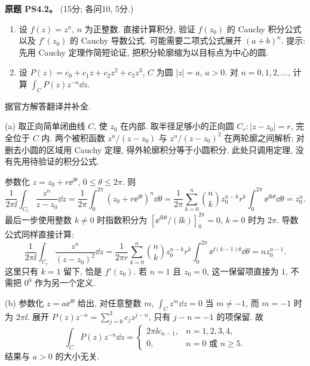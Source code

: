 \begin{exercise}\label{ass:ps4-2}
\textbf{原题 PS4.2。} (15分; 各问10, 5分.)
\begin{enumerate}[label=(\alph*)]
\item 设 $f(z)=z^n$, $n$ 为正整数. 直接计算积分, 验证 $f(z_0)$ 的 Cauchy 积分公式以及 $f'(z_0)$ 的 Cauchy 导数公式.
可能需要二项式公式展开 $(a+b)^n$. 提示: 先用 Cauchy 定理作简短论证, 把积分轮廓缩为以目标点为中心的圆.
\item 设 $P(z)=c_0+c_1z+c_2z^2+c_3z^3$, $C$ 为圆 $|z|=a$, $a>0$. 对 $n=0,1,2,\ldots$, 计算 $\int_CP(z)z^{-n}\dd z$.
\end{enumerate}
\end{exercise}
\begin{solution}
据官方解答翻译并补全.

(a) 取正向简单闭曲线 $C$, 使 $z_0$ 在内部. 取半径足够小的正向圆
$C_r:|z-z_0|=r$, 完全位于 $C$ 内. 两个被积函数 $z^n/(z-z_0)$ 与 $z^n/(z-z_0)^2$ 在两轮廓之间解析; 对删去小圆的区域用 Cauchy 定理, 得外轮廓积分等于小圆积分. 此处只调用定理, 没有先用待验证的积分公式.

参数化 $z=z_0+r\ee^{\ii\theta}$, $0\le\theta\le2\pi$. 则
\[
 \frac1{2\pi\ii}\int_{C_r}\frac{z^n}{z-z_0}\dd z
 =\frac1{2\pi}\int_0^{2\pi}
       (z_0+r\ee^{\ii\theta})^n\dd\theta
 =\frac1{2\pi}\sum_{k=0}^n\binom nk z_0^{n-k}r^k
       \int_0^{2\pi}\ee^{\ii k\theta}\dd\theta
 =z_0^n.
\]
最后一步使用整数 $k\ne0$ 时指数积分为
$[\ee^{\ii k\theta}/(\ii k)]_0^{2\pi}=0$, $k=0$ 时为 $2\pi$.
导数公式同样直接计算:
\[
 \frac1{2\pi\ii}\int_{C_r}\frac{z^n}{(z-z_0)^2}\dd z
 =\frac1{2\pi r}\sum_{k=0}^n\binom nk z_0^{n-k}r^k
       \int_0^{2\pi}\ee^{\ii(k-1)\theta}\dd\theta
 =nz_0^{n-1}.
\]
这里只有 $k=1$ 留下, 恰是 $f'(z_0)$.
若 $n=1$ 且 $z_0=0$, 这一保留项直接为 $1$, 不需把 $0^0$ 作为另一个定义.

(b) 参数化 $z=a\ee^{\ii\theta}$ 给出, 对任意整数 $m$,
$\int_Cz^m\dd z=0$ 当 $m\ne-1$, 而 $m=-1$ 时为 $2\pi\ii$.
展开 $P(z)z^{-n}=\sum_{j=0}^3c_jz^{j-n}$, 只有 $j-n=-1$ 的项保留. 故
\[
 \int_CP(z)z^{-n}\dd z=
 \begin{cases}
 2\pi\ii c_{n-1},&n=1,2,3,4,\\
 0,&n=0\text{ 或 }n\ge5.
 \end{cases}
\]
结果与 $a>0$ 的大小无关.
\end{solution}

